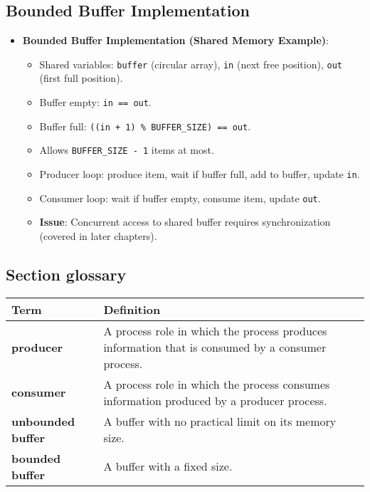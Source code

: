 \subsection{Bounded Buffer Implementation}
\begin{itemize}
    \item \textbf{Bounded Buffer Implementation (Shared Memory Example)}:
        \begin{itemize}
            \item Shared variables: \texttt{buffer} (circular array), \texttt{in} (next free position), \texttt{out} (first full position).
            \item Buffer empty: \texttt{in == out}.
            \item Buffer full: \texttt{((in + 1) \% BUFFER\_SIZE) == out}.
            \item Allows \texttt{BUFFER\_SIZE - 1} items at most.
            \item Producer loop: produce item, wait if buffer full, add to buffer, update \texttt{in}.
            \item Consumer loop: wait if buffer empty, consume item, update \texttt{out}.
            \item \textbf{Issue}: Concurrent access to shared buffer requires synchronization (covered in later chapters).
        \end{itemize}
\end{itemize}
\subsection*{Section glossary}
\centering
\begin{tabular}{>{\raggedright}p{} >{\raggedright\arraybackslash}p{}}
\toprule
\textbf{Term} & \textbf{Definition} \\
\midrule
\textbf{producer} & A process role in which the process produces information that is consumed by a consumer process. \\
\textbf{consumer} & A process role in which the process consumes information produced by a producer process. \\
\textbf{unbounded buffer} & A buffer with no practical limit on its memory size. \\
\textbf{bounded buffer} & A buffer with a fixed size. \\
\bottomrule
\end{tabular}
\vspace{\baselineskip}
